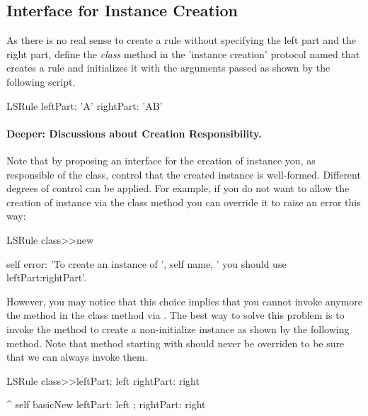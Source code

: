 
\subsection{Interface for Instance Creation} 
As there is no real sense to create a rule without specifying the left
part and the right part, define the \emph{class} method in the
'instance creation' protocol named  that
creates a rule and initializes it with the arguments passed as shown
by the following script.

\begin{scriptwithouttitle}
LSRule leftPart: 'A' rightPart: 'AB'
\end{scriptwithouttitle}


\paragraph{Deeper: Discussions about Creation Responsibility.}
Note that by proposing an interface for the creation of instance you,
as responsible of the class, control that the created instance is
well-formed. Different degrees of control can be applied. For example, if you
do not want to allow the creation of instance via the class method  you can 
override it to raise an error this way: 

\begin{method}
LSRule class>>new
   
   self error: 'To create an instance of ', 
               self name, 
               ' you should use leftPart:rightPart'.
\end{method}

However, you may notice that this choice implies that you cannot
invoke anymore the method  in the class method
 via . The best way to solve this problem is  to invoke the method  to create a non-initialize instance
as shown by the following method. Note that method starting with
 should never be overriden to be sure that we can always
invoke them.

\begin{method}
LSRule class>>leftPart: left rightPart: right

  ^ self basicNew leftPart: left ; rightPart: right
\end{method}

